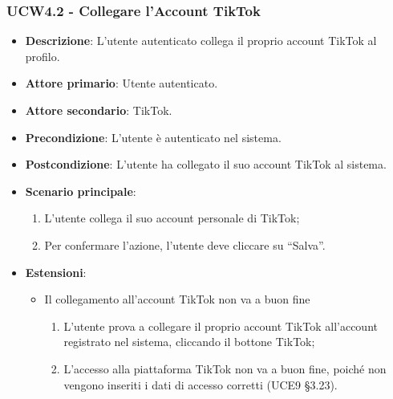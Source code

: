 \subsubsection{UCW4.2 - Collegare l'Account TikTok}
\begin{itemize}
\item \textbf{Descrizione}: L'utente autenticato collega il proprio account TikTok al profilo.
\item \textbf{Attore primario}: Utente autenticato.
\item \textbf{Attore secondario}: TikTok.
\item \textbf{Precondizione}: L’utente è autenticato nel sistema.
\item \textbf{Postcondizione}: L’utente ha collegato il suo account TikTok al sistema.

\item \textbf{Scenario principale}:
\begin{enumerate}
\item L’utente collega il suo account personale di TikTok;
\item Per confermare l’azione, l’utente deve cliccare su “Salva”. 
\end{enumerate}

\item \textbf{Estensioni}:
\begin{itemize}
\item Il collegamento all’account TikTok non va a buon fine
\begin{enumerate}
	\item L’utente prova a collegare il proprio account TikTok all’account registrato nel sistema, cliccando il bottone TikTok;
	\item L’accesso alla piattaforma TikTok non va a buon fine, poiché non vengono inseriti i dati di accesso corretti (UCE9 §3.23).
\end{enumerate}
\end{itemize}
\end{itemize}

